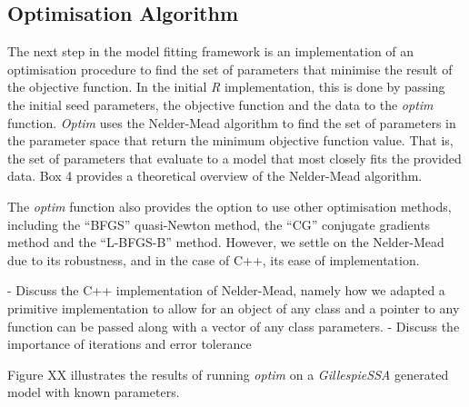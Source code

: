 \subsection{Optimisation Algorithm}
The next step in the model fitting framework is an implementation of
an optimisation procedure to find the set of parameters that minimise
the result of the objective function. In the initial \emph{R}
implementation, this is done by passing the initial seed parameters,
the objective function and the data to the \emph{optim}
function. \emph{Optim} uses the Nelder-Mead algorithm to find the set
of parameters in the parameter space that return the minimum objective
function value. That is, the set of parameters that evaluate to a
model that most closely fits the provided data. Box 4 provides a
theoretical overview of the Nelder-Mead algorithm. 

The \emph{optim} function also provides the option to use other optimisation methods,
including the ``BFGS'' quasi-Newton method, the ``CG'' conjugate
gradients method and the ``L-BFGS-B'' method. However, we settle on the
Nelder-Mead due to its robustness, and in the case of C++, its ease of
implementation. 


- Discuss the C++ implementation of Nelder-Mead, namely how we adapted
 a primitive implementation to allow for an object of any class and a pointer to
 any function can be passed along with a vector of any class
 parameters.
- Discuss the importance of iterations and error tolerance

Figure XX illustrates the results of running \emph{optim} on a
\emph{GillespieSSA} generated model with known parameters.

